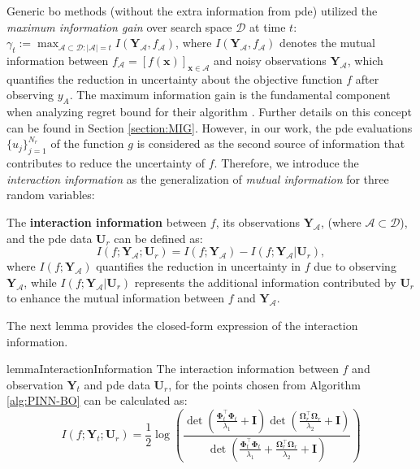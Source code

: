 Generic \ac{bo} methods (without the extra information from \ac{pde}) utilized the \textit{maximum information gain} over search space $\mathcal{D}$ at time $t$:
    $\gamma_t := \max_{\mathcal{A} \subset \mathcal{D}: \lvert \mathcal{A} \rvert=t} I(\mathbf{Y}_\mathcal{A}, f_\mathcal{A})$, 
    where $I(\mathbf{Y}_\mathcal{A}, f_\mathcal{A})$ denotes the mutual information between $f_\mathcal{A} = [f(\mathbf{x})]_{\mathbf{x}\in \mathcal{A}}$ and noisy observations $\mathbf{Y}_\mathcal{A}$, which quantifies the reduction in uncertainty about the objective function $f$ after observing $y_A$. The maximum information gain is the fundamental component when analyzing regret bound for their algorithm \citep{srinivas2009gaussian,vakili2021optimal}. Further details on this concept can be found in Section \ref{section:MIG}. However, in our work, the \ac{pde} evaluations $\{u_j\}_{j=1}^{N_r}$ of the function $g$ is considered as the second source of information that contributes to reduce the uncertainty of $f$. Therefore, we introduce the \textit{interaction information} as the generalization of \textit{mutual information} for three random variables:
\begin{definition}
\label{def:pinn-bo_interaction_information}
The \textbf{interaction information} between $f$,  its observations $\mathbf{Y}_\mathcal{A}$, (where $ \mathcal{A} \subset \mathcal{D}$), and the \ac{pde} data $\mathbf{U}_r$ can be defined as:
\[
I (f; \mathbf{Y}_\mathcal{A}; \mathbf{U}_r) = I (f; \mathbf{Y}_\mathcal{A}) - I (f; \mathbf{Y}_\mathcal{A} \rvert \mathbf{U}_r),
\]
where $I(f; \mathbf{Y}_\mathcal{A})$ quantifies the reduction in uncertainty in $f$ due to observing $\mathbf{Y}_\mathcal{A}$, while $I(f; \mathbf{Y}_\mathcal{A} \rvert \mathbf{U}_r)$ represents the additional information contributed by $\mathbf{U}_r$ to enhance the mutual information between $f$ and $\mathbf{Y}_\mathcal{A}$. 
\end{definition}
The next lemma provides the closed-form expression of the interaction information. 
\begin{restatable}{lemma}{InteractionInformation} 
    \label{lemma:pinn-bo_interaction_information_formula}
    The interaction information between $f$ and observation $\mathbf{Y}_t$ and \ac{pde} data $\mathbf{U}_r$, for the points chosen from Algorithm \ref{alg:PINN-BO} can be calculated as:
    \begin{equation*}
        I (f; \mathbf{Y}_t; \mathbf{U}_r) = \frac{1}{2}  \log (\frac{\det(\frac{\boldsymbol{\Phi}_t^\top \boldsymbol{\Phi}_t}{\lambda_1} + \mathbf{I})\det(\frac{\boldsymbol{\Omega}_r^\top \boldsymbol{\Omega}_r}{\lambda_2} + \mathbf{I})}{\det(\frac{\boldsymbol{\Phi}_t^\top \boldsymbol{\Phi}_t}{\lambda_1} + \frac{\boldsymbol{\Omega}_r^\top \boldsymbol{\Omega}_r}{\lambda_2} + \mathbf{I})})
    \end{equation*}
\end{restatable}

